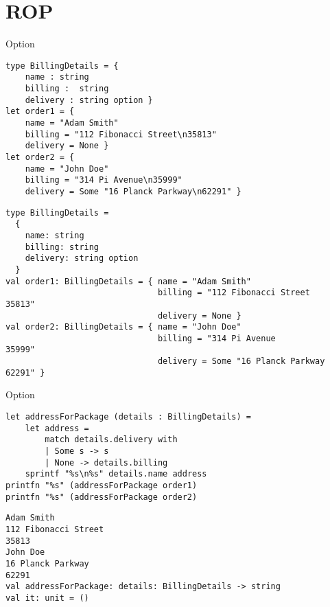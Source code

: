\documentclass[t]{beamer}
\begin{document}
\section{ROP }
\label{sec:orgad2cc6e}
\begin{frame}[label={sec:org2bafab0},fragile]{Option}
 \begin{verbatim}
type BillingDetails = { 
    name : string
    billing :  string
    delivery : string option }
let order1 = {
    name = "Adam Smith"
    billing = "112 Fibonacci Street\n35813" 
    delivery = None }
let order2 = {
    name = "John Doe"
    billing = "314 Pi Avenue\n35999"
    delivery = Some "16 Planck Parkway\n62291" }
\end{verbatim}

\begin{verbatim}
type BillingDetails =
  {
    name: string
    billing: string
    delivery: string option
  }
val order1: BillingDetails = { name = "Adam Smith"
                               billing = "112 Fibonacci Street
35813"
                               delivery = None }
val order2: BillingDetails = { name = "John Doe"
                               billing = "314 Pi Avenue
35999"
                               delivery = Some "16 Planck Parkway
62291" }
\end{verbatim}
\end{frame}

\begin{frame}[label={sec:org4dd4405},fragile]{Option}
 \begin{verbatim}
let addressForPackage (details : BillingDetails) = 
    let address =
        match details.delivery with 
        | Some s -> s
        | None -> details.billing
    sprintf "%s\n%s" details.name address
printfn "%s" (addressForPackage order1)
printfn "%s" (addressForPackage order2)
\end{verbatim}

\begin{verbatim}
Adam Smith
112 Fibonacci Street
35813
John Doe
16 Planck Parkway
62291
val addressForPackage: details: BillingDetails -> string
val it: unit = ()
\end{verbatim}
\end{frame}
\end{document}
